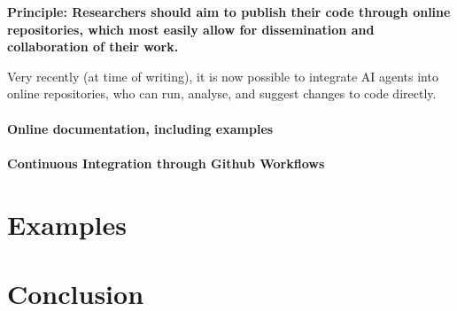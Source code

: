 \documentclass[twocolumn]{willarticle}
\newcommand\Principle[1]{\begin{framed}\bfseries Principle: #1\end{framed}}
\begin{document}
\Principle{Researchers should aim to publish their code through online repositories, which most easily allow for dissemination and collaboration of their work.}

Very recently (at time of writing), it is now possible to integrate AI agents into online repositories, who can run, analyse, and suggest changes to code directly.


\paragraph{Online documentation, including examples}

\paragraph{Continuous Integration through Github Workflows}

\section{Examples}

\section{Conclusion}

\onecolumn
\clearpage
\printbibliography
\end{document}
